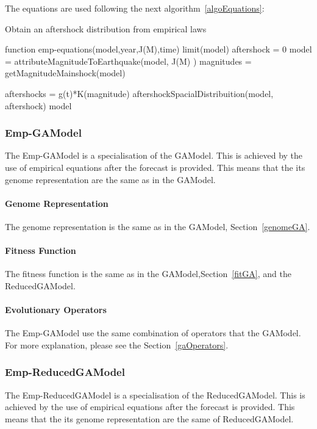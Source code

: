 The equations are used following the next algorithm~\ref{algoEquations}:

\begin{algorithm}[H]\label{algoEquations}
	\caption{Obtain an aftershock distribution from empirical laws}
	\begin{algorithmic}	
		\STATE function emp-equations(model,year,J(M),time)
		\STATE limit(model) 
		\STATE aftershock = 0
		\STATE model  = attributeMagnitudeToEarthquake(model, J(M) )
		\STATE magnitudes = getMagnitudeMainshock(model)
		
				\STATE aftershocks = g(t)*K(magnitude)
			\ENDWHILE
		\ENDWHILE
		\STATE aftershockSpacialDistribuition(model, aftershock) 
		\RETURN model
	\end{algorithmic}
\end{algorithm}

\subsubsection{Emp-GAModel}\label{emp-gamodel}
The Emp-GAModel is a specialisation of the GAModel. This is achieved by the use of empirical equations after the forecast is provided. This means that the its genome representation are the same as in the GAModel.
\paragraph{\textbf{Genome Representation}}
The genome representation is the same as in the GAModel, Section~\ref{genomeGA}.

\paragraph{\textbf{Fitness Function}}
The fitness function is the same as in the GAModel,Section~\ref{fitGA}, and the ReducedGAModel.
\paragraph{\textbf{Evolutionary Operators}}
The Emp-GAModel use the same combination of operators that the GAModel. For more explanation, please see the Section~\ref{gaOperators}.

\subsubsection{Emp-ReducedGAModel}\label{emp-reducedgamodel}
The Emp-ReducedGAModel is a specialisation of the ReducedGAModel. This is achieved by the use of empirical equations after the forecast is provided. This means that the its genome representation are the same of ReducedGAModel.

